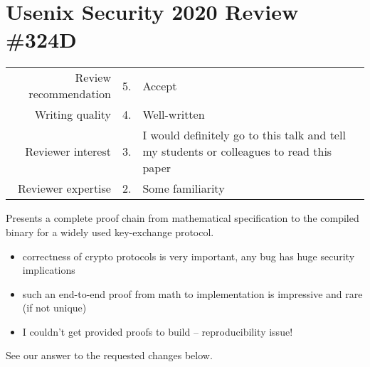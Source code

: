 \newpage
\section*{Usenix Security 2020 Review \#324D}

\begin{tabular}{rrp{}}
    \toprule
    Review recommendation & 5.& Accept                                                                \\
    Writing quality       & 4.& Well-written                                                          \\
    Reviewer interest     & 3.& I would definitely go to this talk and tell my students or colleagues to read this paper \\
    Reviewer expertise    & 2.& Some familiarity                                                      \\
    \bottomrule
\end{tabular}

\begin{center}
\end{center}
Presents a complete proof chain from mathematical specification to the compiled binary for a widely used key-exchange protocol.

\begin{center}
\end{center}

\begin{itemize}
    \item correctness of crypto protocols is very important, any bug has huge security implications
    \item such an end-to-end proof from math to implementation is impressive and rare (if not unique)
\end{itemize}


\begin{center}
\end{center}

\begin{itemize}
    \item I couldn't get provided proofs to build – reproducibility issue!
\end{itemize}
\begin{answer}
  See our answer to the requested changes below. 
\end{answer}

